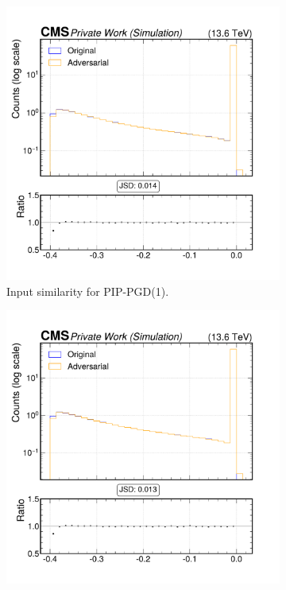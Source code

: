\begin{figure}[htbp]
  \centering
  \begin{subfigure}[t]{0.32\textwidth}
    \includegraphics[width=\linewidth]{media/output/features/compare/combined_it_1/cmp_cpf_arr_Cpfcan_drminsv.pdf}
    \caption*{Input similarity for PIP-PGD(1).}
  \end{subfigure}\hfill
  \begin{subfigure}[t]{0.32\textwidth}
    \includegraphics[width=\linewidth]{media/output/features/compare/combined_it_2/cmp_cpf_arr_Cpfcan_drminsv.pdf}

\end{subfigure}
\end{figure}
